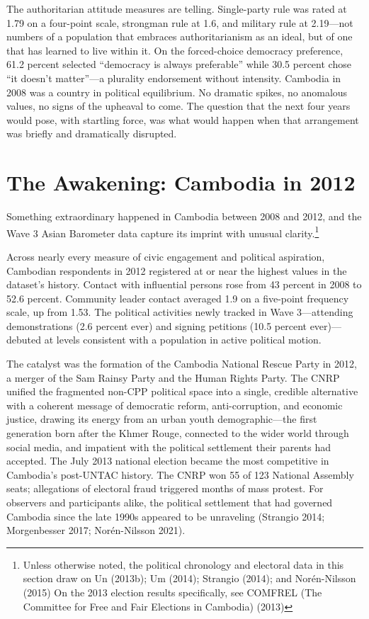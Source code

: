 \documentclass[Review,times,sageh,doublespace]{sagej}
\begin{document}
The authoritarian attitude measures are telling. Single-party rule was
rated at 1.79 on a four-point scale, strongman rule at 1.6, and military
rule at 2.19---not numbers of a population that embraces
authoritarianism as an ideal, but of one that has learned to live within
it. On the forced-choice democracy preference, 61.2 percent selected
``democracy is always preferable'' while 30.5 percent chose ``it doesn't
matter''---a plurality endorsement without intensity. Cambodia in 2008
was a country in political equilibrium. No dramatic spikes, no anomalous
values, no signs of the upheaval to come. The question that the next
four years would pose, with startling force, was what would happen when
that arrangement was briefly and dramatically disrupted.

\section{The Awakening: Cambodia in
2012}\label{the-awakening-cambodia-in-2012}

Something extraordinary happened in Cambodia between 2008 and 2012, and
the Wave 3 Asian Barometer data capture its imprint with unusual
clarity.\footnote{Unless otherwise noted, the political chronology and
  electoral data in this section draw on Un (2013b); Um (2014); Strangio
  (2014); and Norén-Nilsson (2015) On the 2013 election results
  specifically, see COMFREL (The Committee for Free and Fair Elections
  in Cambodia) (2013)}

Across nearly every measure of civic engagement and political
aspiration, Cambodian respondents in 2012 registered at or near the
highest values in the dataset's history. Contact with influential
persons rose from 43 percent in 2008 to 52.6 percent. Community leader
contact averaged 1.9 on a five-point frequency scale, up from 1.53. The
political activities newly tracked in Wave 3---attending demonstrations
(2.6 percent ever) and signing petitions (10.5 percent ever)---debuted
at levels consistent with a population in active political motion.

The catalyst was the formation of the Cambodia National Rescue Party in
2012, a merger of the Sam Rainsy Party and the Human Rights Party. The
CNRP unified the fragmented non-CPP political space into a single,
credible alternative with a coherent message of democratic reform,
anti-corruption, and economic justice, drawing its energy from an urban
youth demographic---the first generation born after the Khmer Rouge,
connected to the wider world through social media, and impatient with
the political settlement their parents had accepted. The July 2013
national election became the most competitive in Cambodia's post-UNTAC
history. The CNRP won 55 of 123 National Assembly seats; allegations of
electoral fraud triggered months of mass protest. For observers and
participants alike, the political settlement that had governed Cambodia
since the late 1990s appeared to be unraveling (Strangio 2014;
Morgenbesser 2017; Norén-Nilsson 2021).
\end{document}
